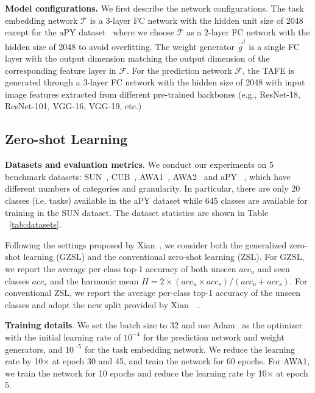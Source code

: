 \documentclass[10pt,twocolumn,letterpaper]{article}
\newcommand\minisection[1]{\vspace{2mm}\noindent \textbf{#1}}
\begin{document}
\minisection{Model configurations.}
We first describe the network configurations. The task embedding network $\mathcal{T}$ is a 3-layer FC network with the hidden unit size of 2048 except 
for the aPY dataset~\cite{farhadi2009describing} where we choose  $\mathcal{T}$ as a 2-layer FC network with the hidden size of 2048 to avoid overfitting. The weight generator $
\Vec{g}^i$ is a single FC layer with the output dimension matching the output dimension
of the corresponding feature layer in $\mathcal{F}$. For the prediction network $\mathcal{F}$, 
the TAFE is generated through a 3-layer FC network with the hidden size of 2048 with input image features 
extracted from different pre-trained backbones (e.g., ResNet-18, ResNet-101, VGG-16, VGG-19, etc.)



\subsection{Zero-shot Learning}
\label{sec:zeroshot}
\minisection{Datasets and evaluation metrics}. We conduct our experiments on 5 benchmark datasets:
SUN~\cite{xiao2010sun}, CUB~\cite{welinder2010caltech}, AWA1~\cite{lampert2009learning}, AWA2~\cite{xian2018zero} and aPY ~\cite{farhadi2009describing}, which have different numbers of categories and granularity. In particular, there are only 20 classes (i.e. tasks) available in the aPY dataset while 645 classes are available for training in the SUN dataset. The dataset statistics are shown in Table ~\ref{tab:datasets}.

Following the settings proposed by Xian~\etal, we consider both the generalized zero-shot learning (GZSL) and
the conventional zero-shot learning (ZSL). For GZSL, we report the average per class top-1 accuracy of both unseen $acc_u$ and seen classes $acc_s$ and the harmonic mean $H = 2 \times (acc_u \times acc_s)/(acc_u+acc_s)$. For conventional ZSL, we report the average per-class top-1 accuracy of the unseen classes and adopt the new split provided by Xian~\etal~\cite{xian2018zero}.

\minisection{Training details}. We set the batch size to 32 and use Adam~\cite{kingma2014adam} as
the optimizer with the initial learning rate of $10^{-4}$ for the prediction network and weight generators, and $10^{-5}$ for the task embedding network. 
We reduce the learning rate by 10$\times$ at epoch 30 and 45, and
train the network for 60 epochs. For AWA1, we train the network for 10 epochs and reduce the learning rate by 10$\times$ at epoch 5. 
\end{document}
